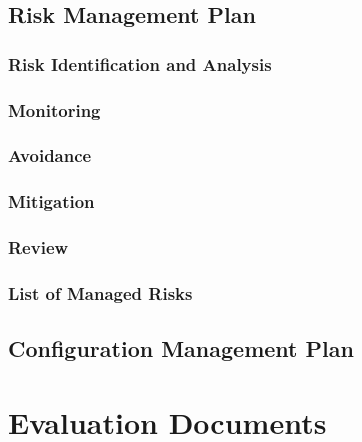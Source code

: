 \documentclass{l3proj}
\begin{document}
\section{Risk Management Plan}
\subsection{Risk Identification and Analysis} 
\subsection{Monitoring}
\subsection{Avoidance}
\subsection{Mitigation}
\subsection{Review}
\subsection{List of Managed Risks}

\section{Configuration Management Plan}



\chapter{Evaluation Documents}
\end{document}

